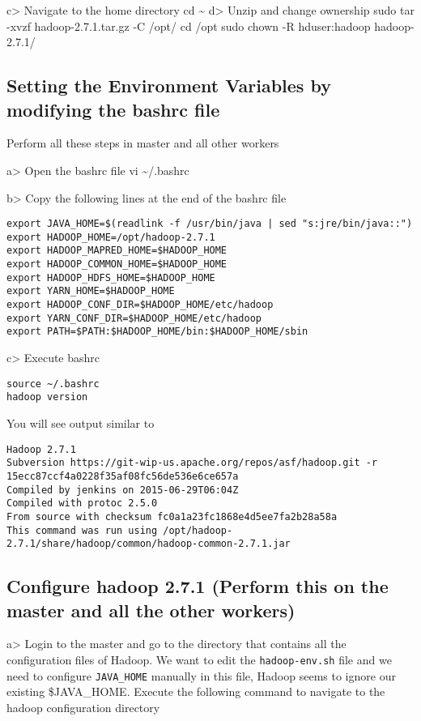 c\textgreater{} Navigate to the home directory cd \textasciitilde{}
d\textgreater{} Unzip and change ownership sudo tar -xvzf
hadoop-2.7.1.tar.gz -C /opt/ cd /opt sudo chown -R hduser:hadoop
hadoop-2.7.1/

\subsection{Setting the Environment Variables by modifying the bashrc file}

Perform all these steps in master and all other workers

a\textgreater{} Open the bashrc file vi \textasciitilde{}/.bashrc

b\textgreater{} Copy the following lines at the end of the bashrc file

\begin{lstlisting}
export JAVA_HOME=$(readlink -f /usr/bin/java | sed "s:jre/bin/java::") 
export HADOOP_HOME=/opt/hadoop-2.7.1 
export HADOOP_MAPRED_HOME=$HADOOP_HOME 
export HADOOP_COMMON_HOME=$HADOOP_HOME 
export HADOOP_HDFS_HOME=$HADOOP_HOME 
export YARN_HOME=$HADOOP_HOME 
export HADOOP_CONF_DIR=$HADOOP_HOME/etc/hadoop 
export YARN_CONF_DIR=$HADOOP_HOME/etc/hadoop 
export PATH=$PATH:$HADOOP_HOME/bin:$HADOOP_HOME/sbin 
\end{lstlisting}

c\textgreater{} Execute bashrc

\begin{lstlisting}
source ~/.bashrc
hadoop version
\end{lstlisting}

You will see output similar to

\begin{lstlisting}
Hadoop 2.7.1
Subversion https://git-wip-us.apache.org/repos/asf/hadoop.git -r 15ecc87ccf4a0228f35af08fc56de536e6ce657a
Compiled by jenkins on 2015-06-29T06:04Z
Compiled with protoc 2.5.0
From source with checksum fc0a1a23fc1868e4d5ee7fa2b28a58a
This command was run using /opt/hadoop-2.7.1/share/hadoop/common/hadoop-common-2.7.1.jar
\end{lstlisting}

\subsection{Configure hadoop 2.7.1 (Perform this on the master and all the other workers)}

a\textgreater{} Login to the master and go to the directory that
contains all the configuration files of Hadoop. We want to edit the
\texttt{hadoop-env.sh} file and we need to configure \texttt{JAVA\_HOME}
manually in this file, Hadoop seems to ignore our existing \$JAVA\_HOME.
Execute the following command to navigate to the hadoop configuration
directory

